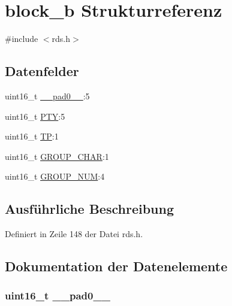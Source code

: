 \hypertarget{structblock__b}{}\section{block\+\_\+b Strukturreferenz}
\label{structblock__b}


{\ttfamily \#include $<$rds.\+h$>$}

\subsection*{Datenfelder}
\begin{DoxyCompactItemize}
\item 
uint16\+\_\+t \hyperlink{structblock__b_a77132c2c26a75f5b8751b235cda23828}{\+\_\+\+\_\+pad0\+\_\+\+\_\+}\+:5
\item 
uint16\+\_\+t \hyperlink{structblock__b_a0474967478fbbc2c71b800d2e0132d45}{P\+T\+Y}\+:5
\item 
uint16\+\_\+t \hyperlink{structblock__b_ab9e634c63b0d95a96716d5f6d7f06d72}{T\+P}\+:1
\item 
uint16\+\_\+t \hyperlink{structblock__b_a66d4119990dc4c3e040a43885e9bb953}{G\+R\+O\+U\+P\+\_\+\+C\+H\+A\+R}\+:1
\item 
uint16\+\_\+t \hyperlink{structblock__b_a9f692e9f76ee88348d426bcd4e9bc70b}{G\+R\+O\+U\+P\+\_\+\+N\+U\+M}\+:4
\end{DoxyCompactItemize}


\subsection{Ausführliche Beschreibung}


Definiert in Zeile 148 der Datei rds.\+h.



\subsection{Dokumentation der Datenelemente}
\hypertarget{structblock__b_a77132c2c26a75f5b8751b235cda23828}{}
\subsubsection[{\+\_\+\+\_\+pad0\+\_\+\+\_\+}]{\setlength{\rightskip}{0pt plus 5cm}uint16\+\_\+t \+\_\+\+\_\+pad0\+\_\+\+\_\+}\label{structblock__b_a77132c2c26a75f5b8751b235cda23828}


